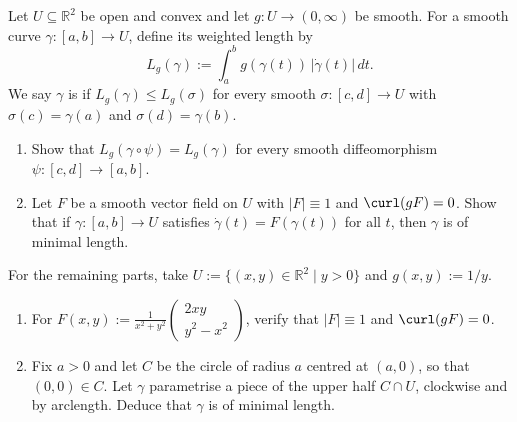 \begin{exercise}
\label{ex:poincare_geodesics_stokes}
Let $U \subseteq \mathbb{R}^2$ be open and convex and let $g : U \to (0,\infty)$ be smooth. For a
smooth curve $\gamma : [a,b] \to U$, define its weighted length by
\[L_g(\gamma) := \int_a^b g(\gamma(t))\,\lvert\dot\gamma(t)\rvert \, dt.\]
We say $\gamma$ is  if $L_g(\gamma) \le L_g(\sigma)$ for every smooth
$\sigma : [c,d] \to U$ with $\sigma(c) = \gamma(a)$ and $\sigma(d) = \gamma(b)$.
\begin{enumerate}[label=\textbf{(\alph*)}]
  \item Show that $L_g(\gamma \circ \psi) = L_g(\gamma)$ for every smooth diffeomorphism
    $\psi : [c,d] \to [a,b]$.
  \item Let $F$ be a smooth vector field on $U$ with $\lvert F\rvert \equiv 1$ and $\curl(g F) = 0$.
    Show that if $\gamma : [a,b] \to U$ satisfies $\dot\gamma(t) = F(\gamma(t))$ for all $t$, then
    $\gamma$ is of minimal length.
\end{enumerate}
For the remaining parts, take $U := \{(x,y) \in \mathbb{R}^2 \mid y > 0\}$ and $g(x,y) := 1/y$.
\begin{enumerate}[label=\textbf{(\alph*)}, resume]
  \item For $F(x,y) := \frac{1}{x^2+y^2} \left(\begin{smallmatrix} 2xy \\ y^2-x^2 \end{smallmatrix}\right)$, verify that $\lvert F\rvert \equiv 1$ and $\curl(gF) = 0$.
  \item Fix $a > 0$ and let $C$ be the circle of radius $a$ centred at $(a,0)$, so that
    $(0,0) \in C$. Let $\gamma$ parametrise a piece of the upper half $C \cap U$, clockwise and by
    arclength. Deduce that $\gamma$ is of minimal length.
\end{enumerate}
\end{exercise}

